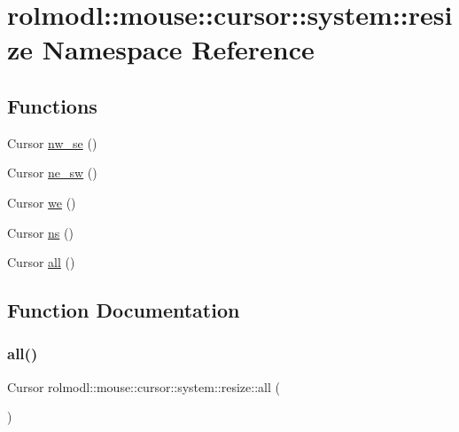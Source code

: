 \hypertarget{namespacerolmodl_1_1mouse_1_1cursor_1_1system_1_1resize}{}\section{rolmodl\+::mouse\+::cursor\+::system\+::resize Namespace Reference}
\label{namespacerolmodl_1_1mouse_1_1cursor_1_1system_1_1resize}
\subsection*{Functions}
\begin{DoxyCompactItemize}
\item 
Cursor \mbox{\hyperlink{namespacerolmodl_1_1mouse_1_1cursor_1_1system_1_1resize_af2dbff3c70f437fca96556c026d23387}{nw\+\_\+se}} ()
\item 
Cursor \mbox{\hyperlink{namespacerolmodl_1_1mouse_1_1cursor_1_1system_1_1resize_ad3811a00338b7e330d73934719fd9894}{ne\+\_\+sw}} ()
\item 
Cursor \mbox{\hyperlink{namespacerolmodl_1_1mouse_1_1cursor_1_1system_1_1resize_ad6e5dd200f8ec02e2e12402a9f33e02b}{we}} ()
\item 
Cursor \mbox{\hyperlink{namespacerolmodl_1_1mouse_1_1cursor_1_1system_1_1resize_a75f52887986e10efda22db250838591a}{ns}} ()
\item 
Cursor \mbox{\hyperlink{namespacerolmodl_1_1mouse_1_1cursor_1_1system_1_1resize_a16fe1d8868e6a9df366888cf46baf3b9}{all}} ()
\end{DoxyCompactItemize}


\subsection{Function Documentation}
\mbox{\label{namespacerolmodl_1_1mouse_1_1cursor_1_1system_1_1resize_a16fe1d8868e6a9df366888cf46baf3b9}} 
\subsubsection{\texorpdfstring{all()}{all()}}
{\footnotesize\ttfamily Cursor rolmodl\+::mouse\+::cursor\+::system\+::resize\+::all (\begin{DoxyParamCaption}{ }\end{DoxyParamCaption})}



